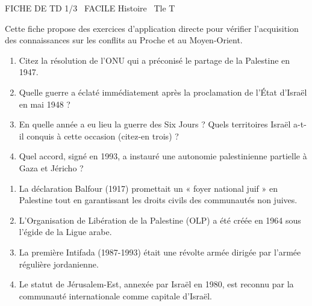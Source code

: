 \documentclass[11pt]{article}
\begin{document}
\begin{tcolorbox}[enhanced,colback=popink,colframe=popink,arc=10pt,boxrule=0pt,left=12pt,right=12pt,top=9pt,bottom=9pt]
{\color{white}\popxbold\small FICHE DE TD 1/3 \textbullet\ FACILE \hfill Histoire \textbullet\ Tle T\par}
\end{tcolorbox}
\vspace{4pt}
Cette fiche propose des exercices d'application directe pour vérifier l'acquisition des connaissances sur les conflits au Proche et au Moyen-Orient.

\begin{exercice}
\begin{enumerate}
    \item Citez la résolution de l'ONU qui a préconisé le partage de la Palestine en 1947.
    \item Quelle guerre a éclaté immédiatement après la proclamation de l'État d'Israël en mai 1948 ?
    \item En quelle année a eu lieu la guerre des Six Jours ? Quels territoires Israël a-t-il conquis à cette occasion (citez-en trois) ?
    \item Quel accord, signé en 1993, a instauré une autonomie palestinienne partielle à Gaza et Jéricho ?
\end{enumerate}
\end{exercice}

\begin{exercice}
\begin{enumerate}
    \item La déclaration Balfour (1917) promettait un « foyer national juif » en Palestine tout en garantissant les droits civils des communautés non juives.
    \item L'Organisation de Libération de la Palestine (OLP) a été créée en 1964 sous l'égide de la Ligue arabe.
    \item La première Intifada (1987-1993) était une révolte armée dirigée par l'armée régulière jordanienne.
    \item Le statut de Jérusalem-Est, annexée par Israël en 1980, est reconnu par la communauté internationale comme capitale d'Israël.
\end{enumerate}
\end{exercice}
\end{document}
